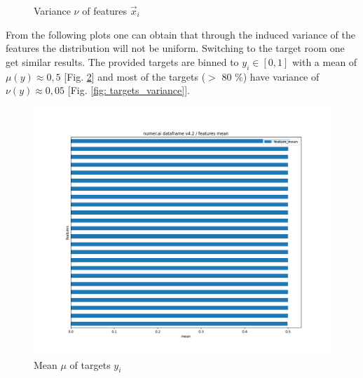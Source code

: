 \documentclass[12pt, a4paper]{article}
\begin{document}
\begin{figure}[htbp]
\begin{minipage}[t]{7cm}
\caption[Variance of Features]{Variance $\nu$ of features $\vec{x}_i$ }
\label{fig: features_variance} 
\end{minipage}
\end{figure}
From the following plots one can obtain that through the induced variance of the features the distribution will not be uniform. Switching to the target room one get similar results. The provided targets are binned to $y_i \in [0,1]$ with a mean of $\mu(y) \approx 0,5$ [Fig. \ref{fig: targets_mean}] and most of the targets ($>$ 80 \%) have variance of $\nu(y) \approx 0,05$ [Fig. \ref{fig: targets_variance}].
\begin{figure}[htbp]
\begin{minipage}[t]{7cm}
\vspace{0pt}
\centering
\includegraphics[width=1\textwidth,trim={0 0 0 0},clip]{figures/targets_df_targets_mean_horizontal_barplot_2023-09-30.png}
\caption[Mean of Targets]{Mean $\mu$ of targets $y_i$} 
\label{fig: targets_mean}  
\end{minipage}
\hfill
\begin{minipage}[t]{7cm}
\vspace{0pt}
\centering

\end{minipage}
\end{figure}
\end{document}
